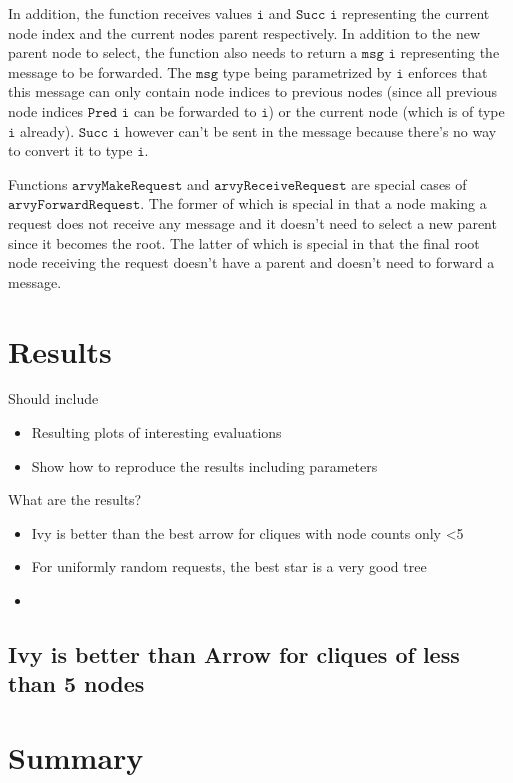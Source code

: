 \documentclass[a4paper, oneside]{discothesis}
\begin{document}
In addition, the function receives values $\texttt{i}$ and $\texttt{Succ i}$ representing the current node index and the current nodes parent respectively. In addition to the new parent node to select, the function also needs to return a $\texttt{msg i}$ representing the message to be forwarded. The $\texttt{msg}$ type being parametrized by $\texttt{i}$ enforces that this message can only contain node indices to previous nodes (since all previous node indices $\texttt{Pred i}$ can be forwarded to $\texttt{i}$) or the current node (which is of type $\texttt{i}$ already). $\texttt{Succ i}$ however can't be sent in the message because there's no way to convert it to type $\texttt{i}$.

Functions $\texttt{arvyMakeRequest}$ and $\texttt{arvyReceiveRequest}$ are special cases of $\texttt{arvyForwardRequest}$. The former of which is special in that a node making a request does not receive any message and it doesn't need to select a new parent since it becomes the root. The latter of which is special in that the final root node receiving the request doesn't have a parent and doesn't need to forward a message.

\chapter{Results}

Should include
\begin{itemize}
\item Resulting plots of interesting evaluations
\item Show how to reproduce the results including parameters
\end{itemize}

What are the results?
\begin{itemize}
\item Ivy is better than the best arrow for cliques with node counts only <5
\item For uniformly random requests, the best star is a very good tree
\item 
\end{itemize}

\section{Ivy is better than Arrow for cliques of less than 5 nodes}
\label{result:clique}

\chapter{Summary}





\end{document}
